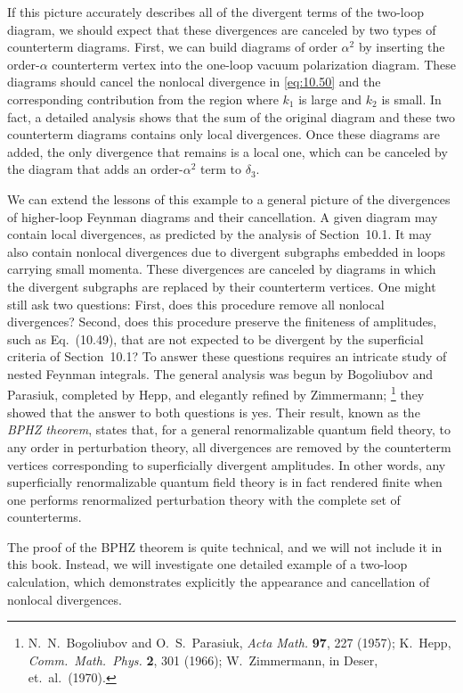 If this picture accurately describes all of the divergent terms of the
two-loop diagram, we should expect that these divergences are canceled by two
types of counterterm diagrams.  First, we can build diagrams of order
$\alpha^2$ by inserting the order-$\alpha$ counterterm vertex into the
one-loop vacuum polarization diagram.  These diagrams should cancel the
nonlocal divergence in \eqref{eq:10.50} and the corresponding contribution
from the region where $k_1$ is large and $k_2$ is small.  In fact, a detailed
analysis shows that the sum of the original diagram and these two counterterm
diagrams contains only local divergences.  Once these diagrams are added, the
only divergence that remains is a local one, which can be canceled by the
diagram that adds an order-$\alpha^2$ term to $\delta_3$.

We can extend the lessons of this example to a general picture of the
divergences of higher-loop Feynman diagrams and their cancellation.  A given
diagram may contain local divergences, as predicted by the analysis of
Section~10.1.  It may also contain nonlocal divergences due to divergent
subgraphs embedded in loops carrying small momenta.  These divergences are
canceled by diagrams in which the divergent subgraphs are replaced by their
counterterm vertices.  One might still ask two questions: First, does this
procedure remove all nonlocal divergences?  Second, does this procedure
preserve the finiteness of amplitudes, such as Eq.~(10.49), that are not
expected to be divergent by the superficial criteria of Section~10.1?  To
answer these questions requires an intricate study of nested Feynman
integrals.  The general analysis was begun by Bogoliubov and Parasiuk,
completed by Hepp, and elegantly refined by Zimmermann;%
\footnote{N.~N.~Bogoliubov and O.~S.~Parasiuk, \emph{Acta Math.} \textbf{97},
227 (1957); K.~Hepp, \emph{Comm.\ Math.\ Phys.} \textbf{2}, 301 (1966);
W.~Zimmermann, in Deser, et.\ al.\ (1970).} they showed that the answer to
both questions is yes.  Their result, known as the \emph{BPHZ theorem}, states
that, for a general renormalizable quantum field theory, to any order in
perturbation theory, all divergences are removed by the counterterm vertices
corresponding to superficially divergent amplitudes.  In other words, any
superficially renormalizable quantum field theory is in fact rendered finite
when one performs renormalized perturbation theory with the complete set of
counterterms.

The proof of the BPHZ theorem is quite technical, and we will not include it in
this book.  Instead, we will investigate one detailed example of a two-loop
calculation, which demonstrates explicitly the appearance and cancellation of
nonlocal divergences.

